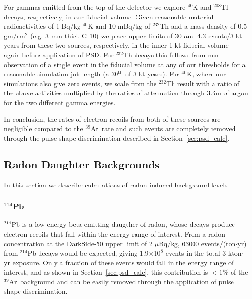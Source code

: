 \documentclass[a4paper,11pt]{article}
\newcommand{\artn}{$^{39}$Ar}
\begin{document}
For gammas emitted from the top of the detector we 
explore $^{40}$K and $^{208}$Tl decays, respectively, 
in our fiducial volume. Given reasonable material radioactivities of 1 Bq/kg $^{40}$K and 10 mBq/kg of $^{232}$Th and a mass density of 0.5 gm/cm$^2$ (e.g. 3-mm thick G-10) we place upper limits of 30 and 4.3 
events/3 kt-years from these two sources, respectively, in the inner 1-kt fiducial volume -- again before application of PSD. For $^{232}$Th decays this follows from non-observation of a single event in the fiducial volume at any of our thresholds for a reasonable simulation job length (a 30$^{\text{th}}$ of 3 kt-years). For $^{40}$K, where our simulations also give zero events,   we scale from the $^{232}$Th result with a ratio of the above activities multiplied by the ratios of attenuation through 3.6m of argon for the two different gamma energies.


In conclusion, the rates of electron recoils from both of these sources are negligible compared to the \artn~rate and such events are completely removed through the pulse shape discrimination described in Section~\ref{sec:psd_calc}.



\subsection{Radon Daughter Backgrounds}
\label{sec:radon_calc}

In this section we describe calculations of radon-induced background levels.

\subsubsection{$^{214}$Pb}
$^{214}$Pb is a low energy beta-emitting daugther of radon, whose decays produce electron recoils that fall within the energy range of interest. From a radon concentration at the DarkSide-50 upper limit of 2 $\mu$Bq/kg, 63000 events/(ton$\cdot$yr) from $^{214}$Pb decays would be expected, giving 1.9$\times10^8$ events in the total 3 kton$\cdot$yr exposure. Only a fraction of these events would fall in the energy range of interest, and as shown in Section~\ref{sec:psd_calc}, this contribution is $<1\%$ of the \artn~background and can be easily removed through the application of pulse shape discrimination.
\end{document}
